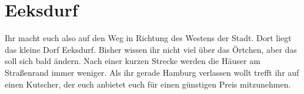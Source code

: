 
\chapter{Eeksdurf}
\label{chap:eeksdurf}

\begin{advquote}
\large Ihr macht euch also auf den Weg in Richtung des Westens der Stadt. Dort liegt
das kleine Dorf Eeksdurf. Bisher wissen ihr nicht viel über das Örtchen, aber das
soll sich bald ändern. Nach einer kurzen Strecke werden die Häuser am Straßenrand
immer weniger. Als ihr gerade Hamburg verlassen wollt trefft ihr auf einen Kutscher,
der euch anbietet euch für einen günstigen Preis mitzunehmen.
\end{advquote}
